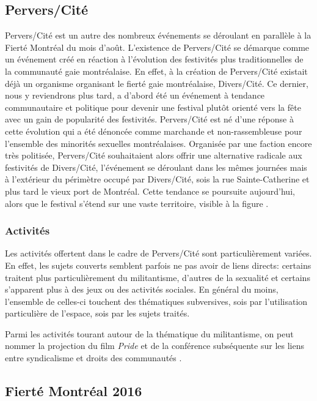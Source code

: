 \subsection{Pervers/Cité}
\label{subsec:perverscite}
Pervers/Cité est un autre des nombreux événements se déroulant en parallèle à la Fierté Montréal du mois d'août.
L'existence de Pervers/Cité se démarque comme un événement créé en réaction à l'évolution des festivités plus traditionnelles de la communauté gaie montréalaise.
En effet, à la création de Pervers/Cité existait déjà un organisme organisant le fierté gaie montréalaise, Divers/Cité.
Ce dernier, nous y reviendrons plus tard, a d'abord été un événement à tendance communautaire et politique pour devenir une festival plutôt orienté vers la fête avec un gain de popularité des festivités.
Pervers/Cité est né d'une réponse à cette évolution qui a été dénoncée comme marchande et non-rassembleuse pour l'ensemble des minorités sexuelles montréalaises.
Organisée par une faction encore très politisée, Pervers/Cité souhaitaient alors offrir une alternative radicale aux festivités de Divers/Cité, l'événement se déroulant dans les mêmes journées mais à l'extérieur du périmètre occupé par Divers/Cité, sois la rue Sainte-Catherine et plus tard le vieux port de Montréal.
Cette tendance se poursuite aujourd'hui, alors que le festival s'étend sur une vaste territoire, visible à la figure .


\subsubsection{Activités}
\label{subsec:activitesperverscite}
Les activités offertent dans le cadre de Pervers/Cité sont particulièrement variées.
En effet, les sujets couverts semblent parfois ne pas avoir de liens directs: certains traitent plus particulièrement du militantisme, d'autres de la sexualité et certains s'apparent plus à des jeux ou des activités sociales.
En général du moins, l'ensemble de celles-ci touchent des thématiques subversives, sois par l'utilisation particulière de l'espace, sois par les sujets traités.

Parmi les activités tourant autour de la thématique du militantisme, on peut nommer la projection du film \emph{Pride} et de la conférence subséquente sur les liens entre syndicalisme et droits des communautés \lgbt{}.

\subsection{Fierté Montréal 2016}
\label{subsec:fiertemontreal2016}

